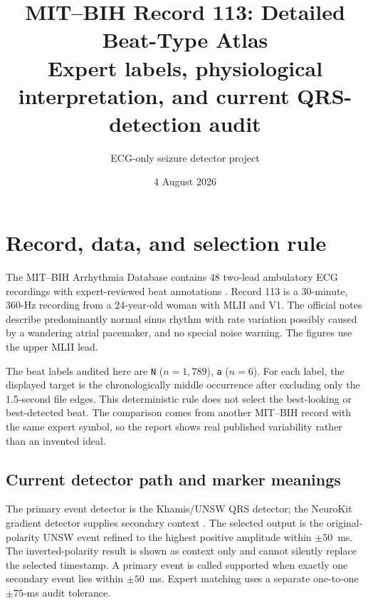 \documentclass[11pt]{article}
\title{\textbf{MIT--BIH Record 113: Detailed Beat-Type Atlas}\\[0.35em]
        \large Expert labels, physiological interpretation, and current QRS-detection audit}
\author{ECG-only seizure detector project}
\date{4 August 2026}
\begin{document}
        \maketitle

        \begin{center}
        \end{center}

        \section{Record, data, and selection rule}

        The MIT--BIH Arrhythmia Database contains 48 two-lead ambulatory ECG recordings with expert-reviewed
        beat annotations \cite{goldberger2000physiobank,moody2001mitbih,physionetmitdb}. Record 113 is
        a 30-minute, 360-Hz recording from a 24-year-old woman with MLII and V1. The official notes describe predominantly normal sinus rhythm with rate variation possibly caused by a wandering atrial pacemaker, and no special noise warning. The figures use the upper MLII lead.

        The beat labels audited here are \texttt{N} ($n=1,789$), \texttt{a} ($n=6$). For each label, the displayed target is the chronologically
        middle occurrence after excluding only the 1.5-second file edges. This deterministic rule does not
        select the best-looking or best-detected beat. The comparison comes from another MIT--BIH record with
        the same expert symbol, so the report shows real published variability rather than an invented ideal.

        \subsection{Current detector path and marker meanings}

        The primary event detector is the Khamis/UNSW QRS detector; the NeuroKit gradient detector supplies
        secondary context \cite{khamis2016telehealth,makowski2021neurokit,kristof2024qrs}. The selected
        output is the original-polarity UNSW event refined to the highest positive amplitude within $\pm50$~ms.
        The inverted-polarity result is shown as context only and cannot silently replace the selected timestamp.
        A primary event is called supported when exactly one secondary event lies within $\pm50$~ms. Expert
        matching uses a separate one-to-one $\pm75$-ms audit tolerance.
\end{document}
